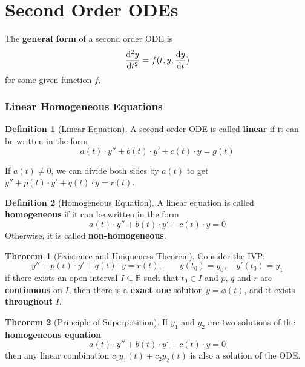 \documentclass[10pt,UTF8]{article}
\newenvironment{definitionBox}
{
  \begin{tcolorbox}[colback=blue!5!white,colframe=blue!75!black,parbox=false,before
  upper=\par,before lower=\par]}
  {
\end{tcolorbox}}
\newenvironment{theoremBox}
{
  \begin{tcolorbox}[colback=yellow!5!white,colframe=yellow!75!black,parbox=false,before
  upper=\par,before lower=\par]}
  {
\end{tcolorbox}}
\theoremstyle{definition}
\newtheorem{definition inner}{Definition}[section]
\newenvironment{definition}[1][]
{
  \begin{definitionBox}
  \begin{definition inner}[#1]\hfill\par}
    {
    \end{definition inner}
\end{definitionBox}}
\theoremstyle{definition}
\newtheorem{theorem inner}{Theorem}[section]
\newenvironment{theorem}[1][]
{
  \begin{theoremBox}
  \begin{theorem inner}[#1]\hfill\par}
    {
    \end{theorem inner}
\end{theoremBox}}
\theoremstyle{definition}
\newtheorem*{proof inner}{\textit{Proof}}
\theoremstyle{plain}
\newtheorem{tip inner}{Tip}[section]
\theoremstyle{remark}
\begin{document}
\part*{Second Order ODEs}

The \textbf{general form} of a second order ODE is
\[
  \dv[2]{y}{t} = f(t,y,\dv{y}{t})
\]
for some given function \(f\).

\section{Linear Homogeneous Equations}

\begin{definition}[Linear Equation]
  A second order ODE is called \textbf{linear}
  if it can be written in the form
  \[
    a(t)\cdot y'' + b(t)\cdot y' + c(t)\cdot y = g(t)
  \]
\end{definition}

If \(a(t) \neq 0\), we can divide both sides by \(a(t)\) to get
\( y'' + p(t)\cdot y' + q(t)\cdot y = r(t) \).

\begin{definition}[Homogeneous Equation]
  A linear equation is called \textbf{homogeneous}
  if it can be written in the form
  \[
    a(t)\cdot y'' + b(t)\cdot y' + c(t)\cdot y = 0
  \]
  Otherwise, it is called \textbf{non-homogeneous}.
\end{definition}

\begin{theorem}[Existence and Uniqueness Theorem]
  {}\label{thm: Existence and Uniqueness Theorem}
  Consider the IVP\@:
  \begin{equation*}
    y'' + p(t)\cdot y' + q(t)\cdot y = r(t),
    \qquad y(t_0) = y_0, \quad y'(t_0) = y_1
  \end{equation*}
  if there exists an open interval \(I \subseteq \mathbb{R}\)
  such that \(t_0 \in I\) and \(p\), \(q\) and \(r\)
  are \textbf{continuous} on \(I\),
  then there is a \textbf{exact one} solution \(y = \phi(t)\),
  and it exists \textbf{throughout} \(I\).
\end{theorem}

\begin{theorem}[Principle of Superposition]
  {}\label{thm: Principle of Superposition}
  If \(y_1\) and \(y_2\) are two solutions of the \textbf{homogeneous equation}
  \[
    a(t)\cdot y'' + b(t)\cdot y' + c(t)\cdot y = 0
  \]
  then any linear combination \(c_1 y_1(t) + c_2 y_2(t)\)
  is also a solution of the ODE\@.
\end{theorem}
\end{document}
